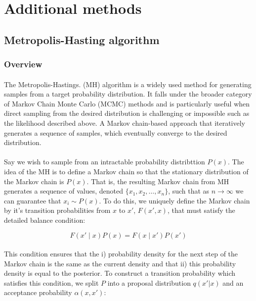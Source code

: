 

\section{Additional methods}
\subsection{Metropolis-Hasting algorithm}
\label{sec:mh1}
\subsubsection{Overview}
\paragraph{} The Metropolis-Hastings. (MH) algorithm is a widely used method for generating samples from a target probability distribution. It falls under the broader category of Markov Chain Monte Carlo (MCMC) methods and is particularly useful when direct sampling from the desired distribution is challenging or impossible such as the likelihood described above. A Markov chain-based approach that iteratively generates a sequence of samples, which eventually converge to the desired distribution. 

\paragraph{}Say we wish to sample from an intractable probability distribttion $P(x)$. The idea of the MH is to define a Markov chain so that the stationary distribution of the Markov chain is $P(x)$. That is, the resulting Markov chain from MH generates a sequence of values, denoted $\{x_1, x_2, \dots,  x_n\}$, such that as $n \rightarrow \infty$ we can guarantee that $x_i \sim P(x)$. To do this, we uniquely define the Markov chain by it's transition probabilities from $x$ to $x'$, $F(x', x)$, that must satisfy the detailed balance condition:

\begin{equation}
\label{eq:db}
F(x' \mid x)P(x)=  F(x\mid x')P(x')
\end{equation}

\paragraph{}This condition ensures that the i) probability density for the next step of the Markov chain is the same as the current density and that ii) this probability density is equal to the posterior.  To construct a transition probability which satisfies this condition, we split $P$ into a proposal distribution $q(x' | x)$ and an acceptance probability $\alpha(x, x')$:

